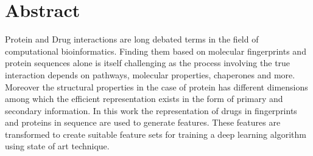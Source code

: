 

\chapter*{Abstract}
Protein and Drug interactions are long debated terms in the field of computational bioinformatics. Finding them based on molecular fingerprints and protein sequences alone is itself challenging as the process involving the true interaction depends on pathways, molecular properties, chaperones and more. Moreover the structural properties in the case of protein has different dimensions among which the efficient representation exists in the form of primary and secondary information. In this work the representation of drugs in fingerprints and proteins in sequence are used to generate features. These features are transformed to create suitable feature sets for training a deep learning algorithm using state of art technique.





